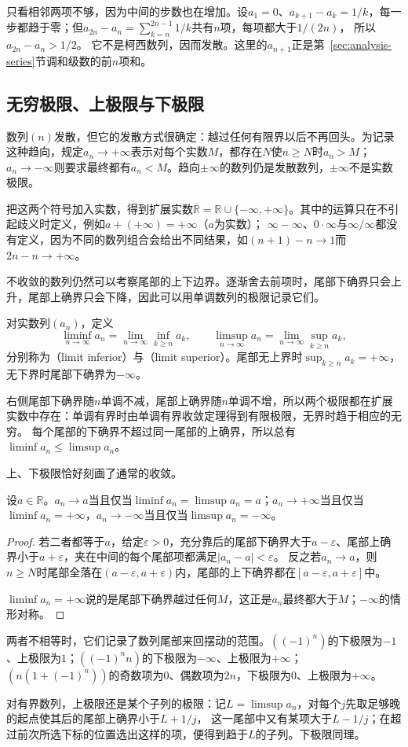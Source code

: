 只看相邻两项不够，因为中间的步数也在增加。设$a_1=0$、$a_{k+1}-a_k=1/k$，每一步都趋于零；但$a_{2n}-a_n=\sum_{k=n}^{2n-1}1/k$共有$n$项，每项都大于$1/(2n)$，
所以$a_{2n}-a_n>1/2$。
它不是柯西数列，因而发散。这里的$a_{n+1}$正是第~\ref{sec:analysis-series}节调和级数的前$n$项和。

\subsection{无穷极限、上极限与下极限}
\label{sec:ru-infinite-limits-limsup}

数列$(n)$发散，但它的发散方式很确定：越过任何有限界以后不再回头。为记录这种趋向，规定$a_n\to+\infty$表示对每个实数$M$，都存在$N$使$n\geq N$时$a_n>M$；
$a_n\to-\infty$则要求最终都有$a_n<M$。趋向$\pm\infty$的数列仍是发散数列，$\pm\infty$不是实数极限。

把这两个符号加入实数，得到扩展实数$\overline{\mathbb R}=\mathbb R\cup\{-\infty,+\infty\}$。其中的运算只在不引起歧义时定义，例如$a+(+\infty)=+\infty$（$a$为实数）；
$\infty-\infty$、$0\cdot\infty$与$\infty/\infty$都没有定义，因为不同的数列组合会给出不同结果，如$(n+1)-n\to1$而$2n-n\to+\infty$。

不收敛的数列仍然可以考察尾部的上下边界。逐渐舍去前项时，尾部下确界只会上升，尾部上确界只会下降，因此可以用单调数列的极限记录它们。
\begin{definition}[上极限与下极限]
\label{def:analysis-liminf-limsup}
对实数列$(a_n)$，定义
\[
 \liminf_{n\to\infty}a_n=\lim_{n\to\infty}\inf_{k\geq n}a_k,\qquad
 \limsup_{n\to\infty}a_n=\lim_{n\to\infty}\sup_{k\geq n}a_k,
\]
分别称为（limit inferior）与（limit superior）。尾部无上界时$\sup_{k\geq n}a_k=+\infty$，无下界时尾部下确界为$-\infty$。
\end{definition}
右侧尾部下确界随$n$单调不减，尾部上确界随$n$单调不增，所以两个极限都在扩展实数中存在：单调有界时由单调有界收敛定理得到有限极限，无界时趋于相应的无穷。
每个尾部的下确界不超过同一尾部的上确界，所以总有$\liminf a_n\leq\limsup a_n$。

上、下极限恰好刻画了通常的收敛。
\begin{theorem}[上下极限与收敛]
\label{thm:ru-limsup-convergence}
设$a\in\mathbb R$。$a_n\to a$当且仅当$\liminf a_n=\limsup a_n=a$；$a_n\to+\infty$当且仅当$\liminf a_n=+\infty$，$a_n\to-\infty$当且仅当$\limsup a_n=-\infty$。
\end{theorem}
\begin{proof}
若二者都等于$a$，给定$\varepsilon>0$，充分靠后的尾部下确界大于$a-\varepsilon$、尾部上确界小于$a+\varepsilon$，夹在中间的每个尾部项都满足$|a_n-a|<\varepsilon$。
反之若$a_n\to a$，则$n\geq N$时尾部全落在$(a-\varepsilon,a+\varepsilon)$内，尾部的上下确界都在$[a-\varepsilon,a+\varepsilon]$中。

$\liminf a_n=+\infty$说的是尾部下确界越过任何$M$，这正是$a_n$最终都大于$M$；$-\infty$的情形对称。
\end{proof}

两者不相等时，它们记录了数列尾部来回摆动的范围。$((-1)^n)$的下极限为$-1$、上极限为$1$；$((-1)^nn)$的下极限为$-\infty$、上极限为$+\infty$；
$(n(1+(-1)^n))$的奇数项为$0$、偶数项为$2n$，下极限为$0$、上极限为$+\infty$。

对有界数列，上极限还是某个子列的极限：记$L=\limsup a_n$，对每个$j$先取足够晚的起点使其后的尾部上确界小于$L+1/j$，
这一尾部中又有某项大于$L-1/j$；在超过前次所选下标的位置选出这样的项，便得到趋于$L$的子列。下极限同理。
